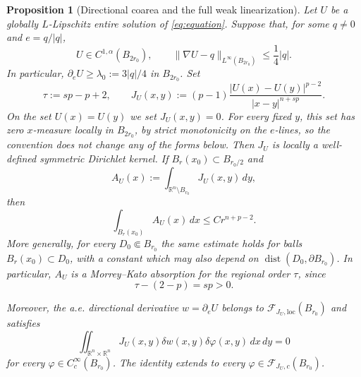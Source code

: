 \documentclass[10pt,a4paper]{amsart}
\newtheorem{proposition}{Proposition}
\newcommand{\R}{\mathbb R}
\newcommand{\dd}{\,d}
\begin{document}
\begin{proposition}[Directional coarea and the full weak linearization]
\label{prop:coarea-weak-linearization}
Let $U$ be a globally $L$-Lipschitz entire solution of
\eqref{eq:equation}.  Suppose that, for some $q\ne0$ and
$e=q/|q|$,
\begin{equation}
 U\in C^{1,\alpha}(B_{2r_0}),
 \qquad
 \|\nabla U-q\|_{L^\infty(B_{2r_0})}\le\frac14|q|.
 \label{eq:strict-directional-monotonicity}
\end{equation}
In particular, $\partial_eU\ge\lambda_0:=3|q|/4$ in $B_{2r_0}$.
Set
\[
 \tau:=sp-p+2,
 \qquad
 J_U(x,y):=(p-1)
 \frac{|U(x)-U(y)|^{p-2}}{|x-y|^{n+sp}}.
\]
On the set \(U(x)=U(y)\) we set \(J_U(x,y)=0\).  For every fixed
\(y\), this set has zero \(x\)-measure locally in \(B_{2r_0}\), by
strict monotonicity on the \(e\)-lines, so the convention does not
change any of the forms below.
Then $J_U$ is locally a well-defined symmetric Dirichlet kernel.  If
$B_r(x_0)\subset B_{r_0/2}$ and
\[
 A_U(x):=\int_{\R^n\setminus B_{r_0}}J_U(x,y)\dd y,
\]
then
\begin{equation}
 \int_{B_r(x_0)}A_U(x)\dd x\le Cr^{n+p-2}.
 \label{eq:crossed-morrey-bound}
\end{equation}
More generally, for every \(D_0\Subset B_{r_0}\) the same estimate
holds for balls \(B_r(x_0)\subset D_0\), with a constant which may also
depend on \(\operatorname{dist}(D_0,\partial B_{r_0})\).
In particular, $A_U$ is a Morrey--Kato absorption for the regional order
$\tau$, since
\begin{equation}
 \tau-(2-p)=sp>0.
 \label{eq:strict-kato-gap}
\end{equation}

Moreover, the a.e. directional derivative \(w=\partial_eU\) belongs to
\(\mathcal F_{J_U,\mathrm{loc}}(B_{r_0})\) and satisfies
\begin{equation}
 \iint_{\R^n\times\R^n}
 J_U(x,y)\delta w(x,y)\delta\varphi(x,y)\dd x\!\dd y=0
\label{eq:full-weak-linearization}
\end{equation}
for every \(\varphi\in C_c^\infty(B_{r_0})\).  The identity extends to
every \(\varphi\in\mathcal F_{J_U,c}(B_{r_0})\).
\end{proposition}
\end{document}
